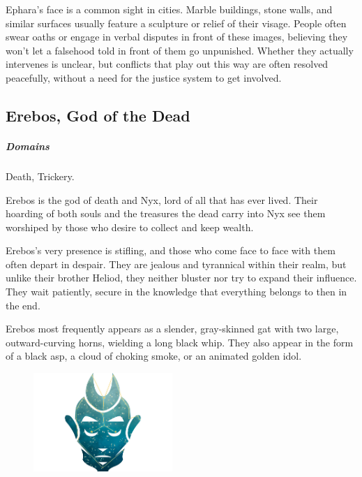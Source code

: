        Ephara's face is a common sight in cities.
        Marble buildings, stone walls, and similar surfaces usually feature a sculpture or relief of their visage.
        People often swear oaths or engage in verbal disputes in front of these images, believing they won't let a falsehood told in front of them go unpunished.
        Whether they actually intervenes is unclear, but conflicts that play out this way are often resolved peacefully, without a need for the justice system to get involved.

\pagebreak

\subsection*{Erebos, God of the Dead} \label{ssec::erebos}
    \subparagraph{Domains} Death, Trickery.

    Erebos is the god of death and Nyx, lord of all that has ever lived.
    Their hoarding of both souls and the treasures the dead carry into Nyx see them worshiped by those who desire to collect and keep wealth.

    Erebos's very presence is stifling, and those who come face to face with them often depart in despair.
    They are jealous and tyrannical within their realm, but unlike their brother Heliod, they neither bluster nor try to expand their influence.
    They wait patiently, secure in the knowledge that everything belongs to then in the end.

    Erebos most frequently appears as a slender, gray-skinned gat with two large, outward-curving horns, wielding a long black whip.
    They also appear in the form of a black asp, a cloud of choking smoke, or an animated golden idol.

    \begin{figure}[b]
        \centering
        \includegraphics[width=0.47\textwidth]{02viphoger/img/10s_erebos.png}
    \end{figure}

